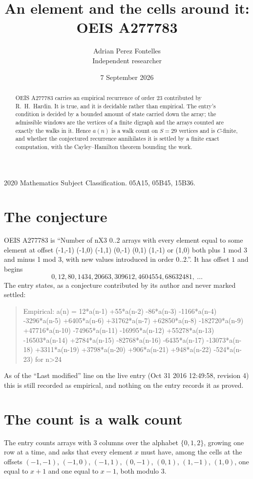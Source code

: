 \documentclass[11pt,a4paper]{article}
\title{An element and the cells around it: OEIS A277783}
\author{Adrian Perez Fontelles\\ \small Independent researcher}
\date{7 September 2026}
\theoremstyle{plain}
\theoremstyle{definition}
\begin{document}
\maketitle

\begin{abstract}
OEIS A277783 carries an empirical recurrence of order $23$ contributed by R.~H.~Hardin. It is
true, and it is decidable rather than empirical. The entry's condition is decided by a bounded amount of state carried down the array; the
admissible windows are the vertices of a finite digraph and the arrays counted are exactly the
walks in it. Hence $a(n)$ is a walk count on $S=29$ vertices and is $C$-finite, and whether the
conjectured recurrence annihilates it is settled by a finite exact computation, with the
Cayley--Hamilton theorem bounding the work.
\end{abstract}

\noindent\small 2020 Mathematics Subject Classification. 05A15, 05B45, 15B36.\normalsize

\section{The conjecture}

OEIS A277783 is ``Number of nX3 0..2 arrays with every element equal to some element at offset (-1,-1) (-1,0) (-1,1) (0,-1) (0,1) (1,-1) or (1,0) both plus 1 mod 3 and minus 1 mod 3, with new values introduced in order 0..2.''. It has offset $1$ and begins
\[
0, 12, 80, 1434, 20663, 309612, 4604554, 68632481,\ \dots
\]
The entry states, as a conjecture contributed by its author and never marked settled:
\begin{quote}
Empirical: a(n) = 12*a(n-1) +55*a(n-2) -86*a(n-3) -1166*a(n-4) -3296*a(n-5) +6405*a(n-6) +31762*a(n-7) +62850*a(n-8) -182720*a(n-9) +47716*a(n-10) -74965*a(n-11) -16995*a(n-12) +55278*a(n-13) -16503*a(n-14) +2784*a(n-15) -82768*a(n-16) -6435*a(n-17) -13073*a(n-18) +3311*a(n-19) +3798*a(n-20) +906*a(n-21) +948*a(n-22) -524*a(n-23) for n>24
\end{quote}
As of the ``Last modified'' line on the live entry (Oct 31 2016 12:49:58, revision 4) this is still
recorded as empirical, and nothing on the entry records it as proved.

\section{The count is a walk count}

The entry counts arrays with $3$ columns over the alphabet $\{0,1,2\}$, growing one row at a time, and asks that every element $x$ must have, among the cells at the offsets $(-1,-1)$, $(-1,0)$, $(-1,1)$, $(0,-1)$, $(0,1)$, $(1,-1)$, $(1,0)$, one equal to $x+1$ and one equal to $x-1$, both modulo $3$.
\end{document}
